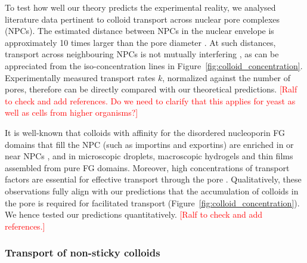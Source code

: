 \documentclass[12pt, a4paper]{article}
\newcommand\todo[1]{\textcolor{red}{#1}}
\begin{document}
To test how well our theory predicts the experimental reality, we analysed literature data pertinent to colloid transport across nuclear pore complexes (NPCs). The estimated distance between NPCs in the nuclear envelope is approximately 10 times larger than the pore diameter \cite{Yang2004, Daigle2001, Feldherr1984, Kubitscheck2000}. At such distances, transport across neighbouring NPCs is not mutually interfering \cite{Fabrikant1985}, as can be appreciated from the iso-concentration lines in Figure~\ref{fig:colloid_concentration}. Experimentally measured transport rates $k$, normalized against the number of pores, therefore can be directly compared with our theoretical predictions.
\todo{[Ralf to check and add references. Do we need to clarify that this applies for yeast as well as cells from higher organisms?]} 

It is well-known that colloids with affinity for the disordered nucleoporin FG domains that fill the NPC (such as importins and exportins) are enriched in or near NPCs \cite{Beck2007, Gruenwald2010, Tu2011}, and in microscopic droplets, macroscopic hydrogels and thin films assembled from pure FG domains.
Moreover, high concentrations of transport factors are essential for effective transport through the pore \cite{Lowe2015}.
Qualitatively, these observations fully align with our predictions that the accumulation of colloids in the pore is required for facilitated transport (Figure~\ref{fig:colloid_concentration}).
We hence tested our predictions quantitatively.
\todo{[Ralf to check and add references.]}


\subsubsection{Transport of non-sticky colloids}
\label{sec:transport_of_non-sticky_colloids}
\end{document}
